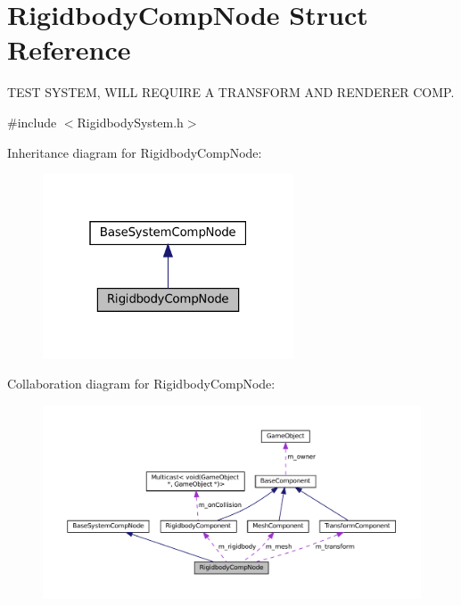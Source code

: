\hypertarget{structRigidbodyCompNode}{}\section{Rigidbody\+Comp\+Node Struct Reference}
\label{structRigidbodyCompNode}


T\+E\+ST S\+Y\+S\+T\+EM, W\+I\+LL R\+E\+Q\+U\+I\+RE A T\+R\+A\+N\+S\+F\+O\+RM A\+ND R\+E\+N\+D\+E\+R\+ER C\+O\+MP.  




{\ttfamily \#include $<$Rigidbody\+System.\+h$>$}



Inheritance diagram for Rigidbody\+Comp\+Node\+:\nopagebreak
\begin{figure}[H]
\begin{center}
\leavevmode
\includegraphics[width=211pt]{structRigidbodyCompNode__inherit__graph}
\end{center}
\end{figure}


Collaboration diagram for Rigidbody\+Comp\+Node\+:\nopagebreak
\begin{figure}[H]
\begin{center}
\leavevmode
\includegraphics[width=350pt]{structRigidbodyCompNode__coll__graph}
\end{center}
\end{figure}

